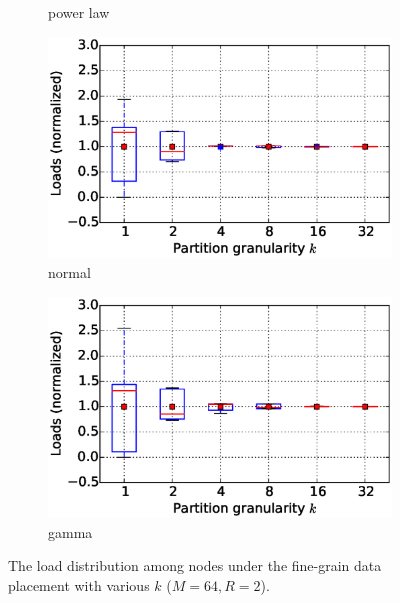 \begin{figure}[!htbp]
\begin{subfigure}[b]{0.45\textwidth}
    \caption{power law}
\end{subfigure}
\begin{subfigure}[b]{0.45\textwidth}
    \includegraphics[width=\linewidth]{figures/E45_simulation_imbalance_fine_std_normal.eps}
    \caption{normal}
\end{subfigure}
\begin{subfigure}[b]{0.45\textwidth}
    \includegraphics[width=\linewidth]{figures/E45_simulation_imbalance_fine_std_gamma.eps}
    \caption{gamma}
\end{subfigure}
\centering
\caption{The load distribution among nodes under the fine-grain data placement with various $k$ ($M=64, R=2$).}
\label{fig:simulation_imbalance_fine}
\end{figure}





